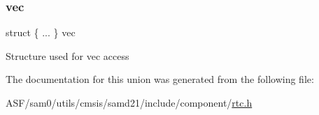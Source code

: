 \subsubsection{\texorpdfstring{vec}{vec}}
{\footnotesize\ttfamily struct \{ ... \}   vec}

Structure used for vec access 

The documentation for this union was generated from the following file\+:\begin{DoxyCompactItemize}
\item 
A\+S\+F/sam0/utils/cmsis/samd21/include/component/\mbox{\hyperlink{component_2rtc_8h}{rtc.\+h}}\end{DoxyCompactItemize}
